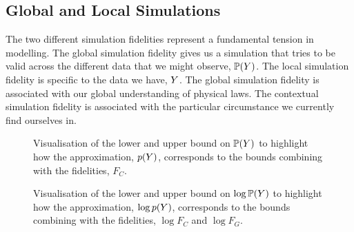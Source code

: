 \documentclass[]{article}
\begin{document}
\subsection{Global and Local Simulations}

The two different simulation fidelities represent a fundamental tension in modelling. The global simulation fidelity gives us a simulation that tries to be valid across the different data that we might observe, $\mathbb{P}(Y)$. The local simulation fidelity is specific to the data we have, $Y$. The global simulation fidelity is associated with our global understanding of physical laws. The contextual simulation fidelity is associated with the particular circumstance we currently find ourselves in.



\begin{figure}
    \centering
    \def\svgwidth{\textwidth}
   
    \caption{Visualisation of the lower and upper bound on $\mathbb{P}(Y)$ to highlight how the approximation, $p(Y)$, corresponds to the bounds combining with the fidelities, $F_C$.}
    \label{fig-py-bounds}
\end{figure}



\begin{figure}
    \centering
    \def\svgwidth{\textwidth}
   
    \caption{Visualisation of the lower and upper bound on $\log \mathbb{P}(Y)$ to highlight how the approximation, $\log p(Y)$, corresponds to the bounds combining with the fidelities, $\log F_C$ and $\log F_G$.}
    \label{fig-log-py-bounds}
\end{figure}
\end{document}
